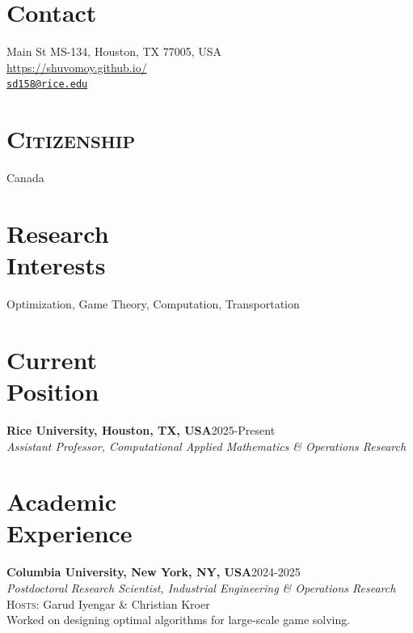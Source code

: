 \documentclass[margin,line,pifont]{./FontsAndCls/custom_res}
\begin{document}

\begin{resume}

\section{\sc Contact}
\faHome {} Main St MS-134, Houston, TX 77005, USA \\
\faGlobe \quad  \url{https://shuvomoy.github.io/}\\
\faEnvelope \quad \texttt{\href{mailto:sd158@rice.edu}{sd158@rice.edu}} \\

\section{ \bfseries\scshape Citizenship}
Canada

\section{\sc Research \\ Interests}

Optimization, Game Theory, Computation, Transportation \\

\section{\sc Current \\ Position}

{\textbf{Rice University, Houston, TX, USA}}\hfill 2025-Present  \\
\textit{Assistant Professor, Computational Applied Mathematics \& Operations Research} 

\section{\sc Academic \\ Experience}


{\textbf{Columbia University, New York, NY, USA}}\hfill 2024-2025  \\
\textit{ Postdoctoral Research Scientist, Industrial Engineering \& Operations Research} \\\textsc{Hosts:} Garud Iyengar \& Christian Kroer  \\
Worked on designing optimal algorithms for large-scale game solving.


\end{resume}
\end{document}
